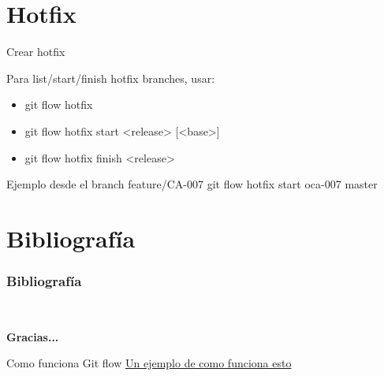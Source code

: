 \documentclass{beamer}
\begin{document}
\section{Hotfix}
\begin{frame}{Crear hotfix}

\begin{block}{Para list/start/finish hotfix branches, usar:}
\begin{itemize}
\item git flow hotfix
\item git flow hotfix start <release> [<base>]
\item git flow hotfix finish <release>
\end{itemize}
\end{block}

\begin{block}{Ejemplo desde el branch feature/CA-007}
git flow hotfix start oca-007 master
\end{block}
\end{frame}

\section{Bibliografía}
\begin{frame}[allowframebreaks]
    \frametitle{Bibliografía}
    
    \tiny{ 
         \
        \
        \nocite{*}}
\end{frame}

\begin{frame}
\begin{center}
\textbf{Gracias...}
\end{center}
\end{frame}

\begin{frame}{Como funciona Git flow}
\href{https://vimeo.com/16018419}{Un ejemplo de como funciona esto}
\end{frame}
\end{document}
